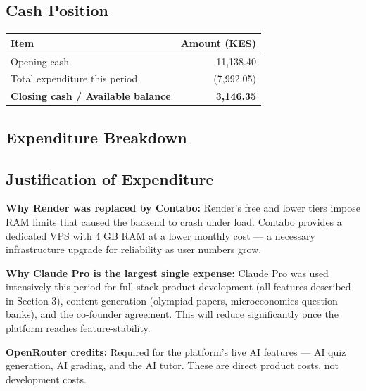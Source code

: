 \documentclass[12pt,a4paper]{article}
\begin{document}
\subsection{Cash Position}

\begin{tabularx}{\linewidth}{X r}
\toprule
\textbf{Item} & \textbf{Amount (KES)} \\
\midrule
\rowcolor{rowgray}
Opening cash & 11,138.40 \\
Total expenditure this period & (7,992.05) \\
\midrule
\textbf{Closing cash / Available balance} & \textbf{3,146.35} \\
\bottomrule
\end{tabularx}

\subsection{Expenditure Breakdown}

\begin{center}
\end{center}

\subsection{Justification of Expenditure}

\textbf{Why Render was replaced by Contabo:}
Render's free and lower tiers impose RAM limits that caused the backend
to crash under load. Contabo provides a dedicated VPS with 4 GB RAM
at a lower monthly cost — a necessary infrastructure upgrade for reliability
as user numbers grow.

\textbf{Why Claude Pro is the largest single expense:}
Claude Pro was used intensively this period for full-stack product development
(all features described in Section 3), content generation (olympiad papers,
microeconomics question banks), and the co-founder agreement.
This will reduce significantly once the platform reaches feature-stability.

\textbf{OpenRouter credits:}
Required for the platform's live AI features — AI quiz generation, AI grading,
and the AI tutor. These are direct product costs, not development costs.
\end{document}
